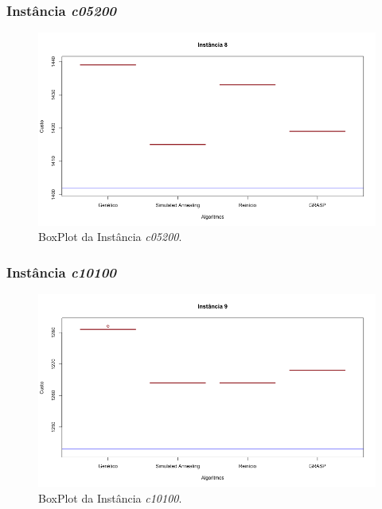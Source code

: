 \documentclass[portugues, brazil, a4paper,12pt]{article}
\begin{document}
		\subsubsection{Instância \textit{c05200}}
			\begin{figure}[H]
				\centering
				\includegraphics[width=1\linewidth]{img/8.png}
				\caption{BoxPlot da Instância \textit{c05200}.}
				\label{fig:c05200}
			\end{figure}
	
		\subsubsection{Instância \textit{c10100}}
			\begin{figure}[H]
				\centering
				\includegraphics[width=1\linewidth]{img/9.png}
				\caption{BoxPlot da Instância \textit{c10100}.}
				\label{fig:c10100}
			\end{figure}
	
\end{document}
